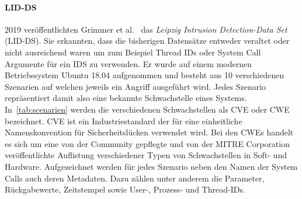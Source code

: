             \paragraph{LID-DS}\label{sec:LIDDS}
                2019 veröffentlichten Grimmer et al.~\cite{LIDDS} das \textit{Leipzig Intrusion Detection-Data Set} (\ac{LID-DS}).
                Sie erkannten, dass die bisherigen Datensätze entweder veraltet oder nicht ausreichend waren um zum Beispiel Thread IDs oder System Call Argumente für ein \ac{IDS} zu verwenden.
                Er wurde auf einem modernen Betriebssystem Ubuntu 18.04 aufgenommen und besteht aus 10 verschiedenen Szenarien auf welchen jeweils ein Angriff ausgeführt wird.
                Jedes Szenario repräsentiert damit also eine bekannte Schwachstelle eines Systems.
                In~\autoref{tab:scenarien} werden die verschiedenen Schwachstellen als \ac{CVE}
                 oder \ac{CWE}  bezeichnet.
                \ac{CVE} ist ein Industriestandard der für eine einheitliche Namenskonvention für Sicherheitslücken verwendet wird.
                Bei den CWEs handelt es sich um eine von der Community gepflegte und von der MITRE Corporation veröffentlichte Auflistung verschiedener Typen von Schwachstellen in Soft- und Hardware.
                Aufgezeichnet werden für jedes Szenario neben den Namen der System Calls auch deren Metadaten.
                Dazu zählen unter anderem die Parameter, Rückgabewerte, Zeitstempel sowie User-, Prozess- und Thread-IDs.
